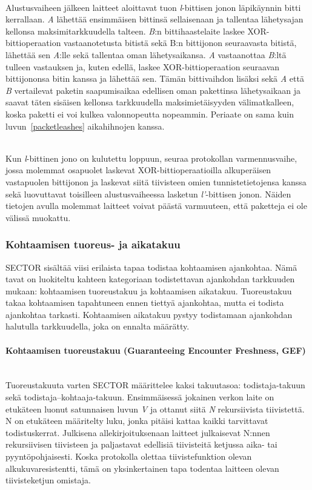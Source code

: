 \documentclass[finnish]{tktltiki2}
\theoremstyle{definition}
\theoremstyle{remark}
\begin{document}
\noindent\\
Alustusvaiheen jälkeen laitteet aloittavat tuon \emph{l}-bittisen jonon läpikäynnin bitti kerrallaan. \emph{A} lähettää ensimmäisen bittinsä sellaisenaan ja tallentaa lähetysajan kellonsa maksimitarkkuudella talteen. \emph{B}:n bittihaastelaite laskee XOR-bittioperaation vastaanotetusta bitistä sekä B:n bittijonon seuraavasta bitistä, lähettää sen \emph{A}:lle sekä tallentaa oman lähetysaikansa. \emph{A} vastaanottaa \emph{B}:ltä tulleen vastauksen ja, kuten edellä, laskee XOR-bittioperaation seuraavan bittijononsa bitin kanssa ja lähettää sen. Tämän bittivaihdon lisäksi sekä \emph{A} että \emph{B} vertailevat paketin saapumisaikaa edellisen oman pakettinsa lähetysaikaan ja saavat täten sisäisen kellonsa tarkkuudella maksimietäisyyden välimatkalleen, koska paketti ei voi kulkea valonnopeutta nopeammin. Periaate on sama kuin luvun~\ref{packetleashes} aikahihnojen kanssa.

\noindent\\
Kun \emph{l}-bittinen jono on kulutettu loppuun, seuraa protokollan varmennusvaihe, jossa molemmat osapuolet laskevat XOR-bittioperaatioilla alkuperäisen vastapuolen bittijonon ja laskevat siitä tiivisteen omien tunnistetietojensa kanssa sekä luovuttavat toisilleen alustusvaiheessa lasketun \emph{l'}-bittisen jonon. Näiden tietojen avulla molemmat laitteet voivat päästä varmuuteen, että paketteja ei ole välissä muokattu.

\subsubsection{Kohtaamisen tuoreus- ja aikatakuu}

SECTOR sisältää viisi erilaista tapaa todistaa kohtaamisen ajankohtaa. Nämä tavat on luokiteltu kahteen kategoriaan todistettavan ajankohdan tarkkuuden mukaan: kohtaamisen tuoreustakuu ja kohtaamisen aikatakuu. Tuoreustakuu takaa kohtaamisen tapahtuneen ennen tiettyä ajankohtaa, mutta ei todista ajankohtaa tarkasti. Kohtaamisen aikatakuu pystyy todistamaan ajankohdan halutulla tarkkuudella, joka on ennalta määrätty. 

\paragraph{Kohtaamisen tuoreustakuu (Guaranteeing Encounter Freshness, GEF)}
\noindent\\
Tuoreustakuuta varten SECTOR määrittelee kaksi takuutasoa: todistaja-takuun sekä todistaja--kohtaaja-takuun. Ensimmäisessä jokainen verkon laite on etukäteen luonut satunnaisen luvun \emph{V} ja ottanut siitä \emph{N} rekursiivista tiivistettä. N on etukäteen määritelty luku, jonka pitäisi kattaa kaikki tarvittavat todistuskerrat. Julkisena allekirjoituksenaan laitteet julkaisevat N:nnen rekursiivisen tiivisteen ja paljastavat edellisiä tiivisteitä ketjussa aika- tai pyyntöpohjaisesti. Koska protokolla olettaa tiivistefunktion olevan alkukuvaresistentti, tämä on yksinkertainen tapa todentaa laitteen olevan tiivisteketjun omistaja.
\end{document}
